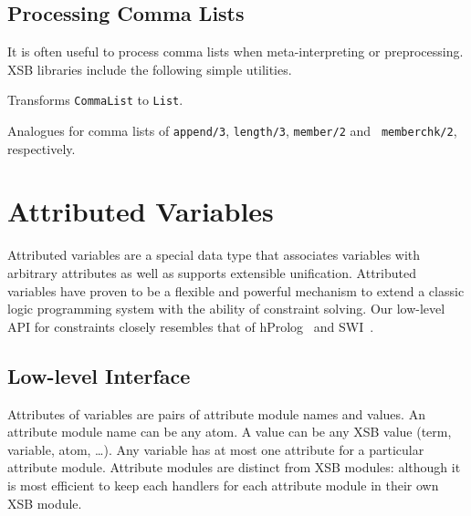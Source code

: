 \subsection{Processing Comma Lists}

It is often useful to process comma lists when meta-interpreting or
preprocessing.  XSB libraries include the following simple utilities.

\begin{description}


%
Transforms {\tt CommaList} to {\tt List}.

%

%

%
%
Analogues for comma lists of {\tt append/3}, {\tt length/3}, {\tt member/2} and {\tt
memberchk/2}, respectively.

\end{description}
	
\section{Attributed Variables} \label{sec:attributed-variables}

%
Attributed variables are a special data type that associates variables
with arbitrary attributes as well as supports extensible unification.
Attributed variables have proven to be a flexible and powerful
mechanism to extend a classic logic programming system with the
ability of constraint solving.  Our low-level API for constraints
closely resembles that of hProlog~\cite{hprolog} and
SWI~\cite{SWI-manual}.

\subsection{Low-level Interface}
%
Attributes of variables are pairs of attribute module names and
values.  An attribute module name can be any atom.  A value can be any
XSB value (term, variable, atom, \ldots). Any variable has at most one
attribute for a particular attribute module.  Attribute modules are
distinct from XSB modules: although it is most efficient to keep each
handlers for each attribute module in their own XSB module.

